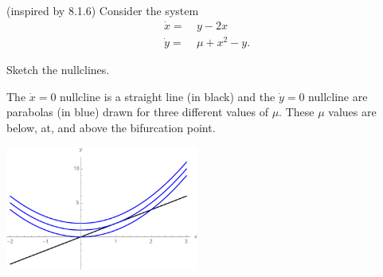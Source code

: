 \documentclass[12pt,letterpaper,answers]{exam}
\begin{document}
\begin{questions}


\question (inspired by 8.1.6) Consider the system
\begin{align*}
\dot{x} = &\ y - 2x \\
\dot{y} = &\ \mu+x^2-y.
\end{align*}
\begin{parts}
\item Sketch the nullclines.
\begin{solution}
The $\dot{x} = 0$ nullcline is a straight line (in black) and the $\dot{y} = 0$ nullcline are parabolas (in blue) drawn for three different values of $\mu$.  These $\mu$ values
are below, at, and above the bifurcation point.


\includegraphics[width=2.5in]{img/C15nullclines.pdf}


\end{solution}
\end{parts}
\end{questions}
\end{document}
